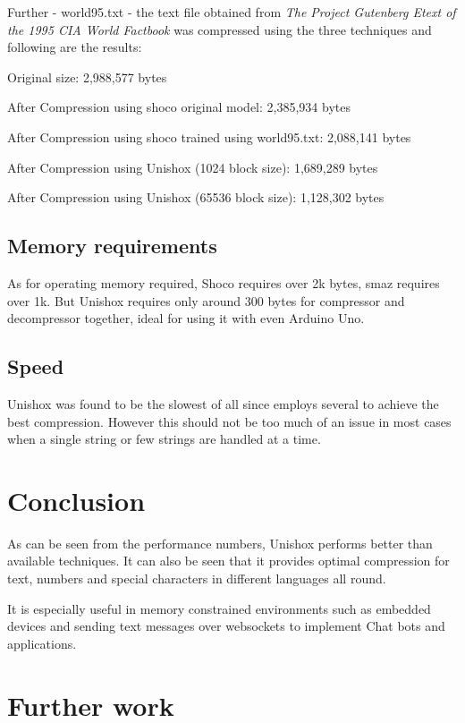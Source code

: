 \documentclass[]{article}
\begin{document}
Further - world95.txt - the text file obtained from \emph{The Project Gutenberg Etext of the 1995 CIA World Factbook} was compressed using the three techniques and following are the results:

Original size: 2,988,577 bytes

After Compression using shoco original model: 2,385,934 bytes

After Compression using shoco trained using world95.txt: 2,088,141 bytes

After Compression using Unishox (1024 block size): 1,689,289 bytes

After Compression using Unishox (65536 block size): 1,128,302 bytes

\subsection{Memory requirements}

As for operating memory required, Shoco requires over 2k bytes, smaz requires over 1k. But Unishox requires only around $300$ bytes for compressor and decompressor together, ideal for using it with even Arduino Uno.

\subsection{Speed}

Unishox was found to be the slowest of all since employs several to achieve the best compression. However this should not be too much of an issue in most cases when a single string or few strings are handled at a time.

\section{Conclusion}

As can be seen from the performance numbers, Unishox performs better than available techniques. It can also be seen that it provides optimal compression for text, numbers and special characters in different languages all round.

It is especially useful in memory constrained environments such as embedded devices and sending text messages over websockets to implement Chat bots and applications.

\section{Further work}
\end{document}
